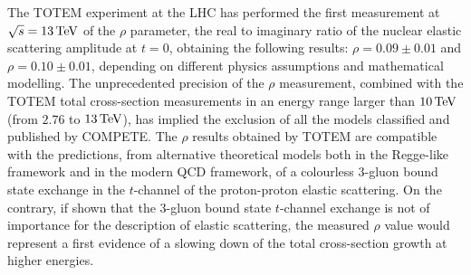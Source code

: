 The TOTEM experiment at the LHC has performed the first measurement at $\sqrt s = 13\,{\rm TeV}$ of the $\rho$ parameter, the real to imaginary ratio of the nuclear elastic scattering amplitude at $t=0$, obtaining the following results: $\rho = 0.09 \pm 0.01$ and $\rho = 0.10 \pm 0.01$, depending on different physics assumptions and mathematical modelling. The unprecedented precision of the $\rho$ measurement, combined with the TOTEM total cross-section measurements in an energy range larger than $10\,{\rm TeV}$ (from $2.76$ to $13\,{\rm TeV}$), has implied the exclusion of all the models classified and published by COMPETE. The $\rho$ results obtained by TOTEM are compatible with the predictions, from alternative theoretical models both in the Regge-like framework and in the modern QCD framework, of a colourless 3-gluon bound state exchange in the $t$-channel of the proton-proton elastic scattering. On the contrary, if shown that the 3-gluon bound state $t$-channel exchange is not of importance for the description of elastic scattering, the measured $\rho$ value would represent a first evidence of a slowing down of the total cross-section growth at higher energies.
